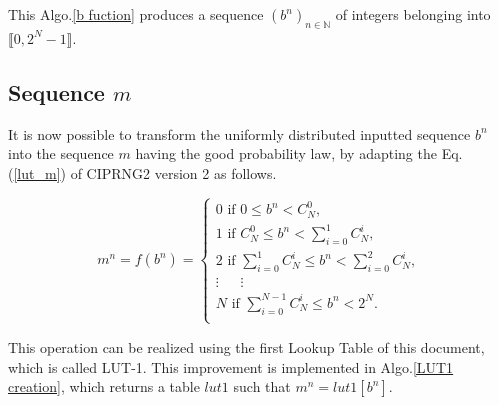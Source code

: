This Algo.\ref{b fuction} produces a sequence $(b^n)_{n \in \mathds{N}}$ of integers belonging into 
$\llbracket 0, 2^N-1 \rrbracket$.


\subsection{Sequence $m$}
\label{LUT1}


It is now possible to transform the uniformly distributed inputted sequence $b^n$ into the sequence $m$ having the good probability law, by adapting the Eq.(\ref{lut_m}) of CIPRNG2 version 2 as follows.

\begin{equation}
\label{lut_m}
m^n = f(b^n)=
\left\{
\begin{array}{l}
0 \text{ if }0				\leqslant {b^n} < {C^0_N},\\
1 \text{ if }{C^0_N}	\leqslant {b^n} < \sum_{i=0}^1 {C^i_N},\\
2 \text{ if }\sum_{i=0}^1{C^i_N}	\leqslant {b^n} < \sum_{i=0}^2 {C^i_N},\\
\vdots~~~~~					~~\vdots~~~		    ~~~~\\
N \text{ if }\sum_{i=0}^{N-1} {C^i_N}	\leqslant {b^n} < 2^N.\\
\end{array}
\right.
\end{equation}

This operation can be realized using the first Lookup 
Table of this document, which is called LUT-1.
%
This improvement is implemented in Algo.\ref{LUT1 creation}, 
which returns a table $lut1$ such that $m^n=lut1[b^n]$.

